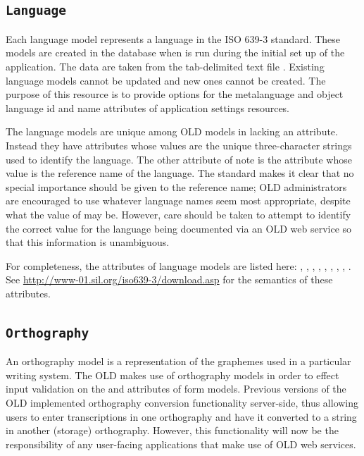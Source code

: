 \documentclass[letterpaper,10pt,english]{sphinxmanual}
\begin{document}
\subsection{\texttt{Language}}
\label{datastructure:language-data-structure}\label{datastructure:language}
Each language model represents a language in the ISO 639-3 standard.  These
models are created in the database when  is run during the
initial set up of the application.  The data are taken from the tab-delimited
text file .  Existing language
models cannot be updated and new ones cannot be created.  The purpose of this
resource is to provide options for the metalanguage and object language id and
name attributes of application settings resources.

The language models are unique among OLD models in lacking an  attribute.
Instead they have  attributes whose values are the unique three-character
strings used to identify the language.  The other attribute of note is the
 attribute whose value is the reference name of the language.  The
standard makes it clear that no special importance should be given to the
reference name; OLD administrators are encouraged to use whatever language names
seem most appropriate, despite what the value of  may be.
However, care should be taken to attempt to identify the correct  value
for the language being documented via an OLD web service so that this
information is unambiguous.

For completeness, the attributes of language models are listed here: ,
, , , , , ,
, .  See
\href{http://www-01.sil.org/iso639-3/download.asp}{http://www-01.sil.org/iso639-3/download.asp} for the semantics of these
attributes.


\subsection{\texttt{Orthography}}
\label{datastructure:orthography}\label{datastructure:orthography-data-structure}
An orthography model is a representation of the graphemes used in a particular
writing system.  The OLD makes use of orthography models in order to effect
input validation on the  and  attributes of
form models.  Previous versions of the OLD implemented orthography conversion
functionality server-side, thus allowing users to enter transcriptions in one
orthography and have it converted to a string in another (storage) orthography.
However, this functionality will now be the responsibility of any user-facing
applications that make use of OLD web services.
\end{document}
